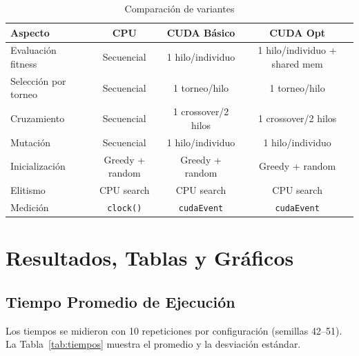 \documentclass[12pt,a4paper]{article}
\begin{document}
\begin{table}[H]
\centering
\caption{Comparaci\'on de variantes}
\begin{tabular}{lccc}
\toprule
\textbf{Aspecto} & \textbf{CPU} & \textbf{CUDA B\'asico} & \textbf{CUDA Opt} \\
\midrule
Evaluaci\'on fitness & Secuencial & 1 hilo/individuo & 1 hilo/individuo + shared mem \\
Selecci\'on por torneo & Secuencial & 1 torneo/hilo & 1 torneo/hilo \\
Cruzamiento & Secuencial & 1 crossover/2 hilos & 1 crossover/2 hilos \\
Mutaci\'on & Secuencial & 1 hilo/individuo & 1 hilo/individuo \\
Inicializaci\'on & Greedy + random & Greedy + random & Greedy + random \\
Elitismo & CPU search & CPU search & CPU search \\
Medici\'on & \texttt{clock()} & \texttt{cudaEvent} & \texttt{cudaEvent} \\
\bottomrule
\end{tabular}
\end{table}

\section{Resultados, Tablas y Gr\'aficos}

\subsection{Tiempo Promedio de Ejecuci\'on}

Los tiempos se midieron con 10 repeticiones por configuraci\'on (semillas 42--51). La Tabla~\ref{tab:tiempos} muestra el promedio y la desviaci\'on est\'andar.
\end{document}
